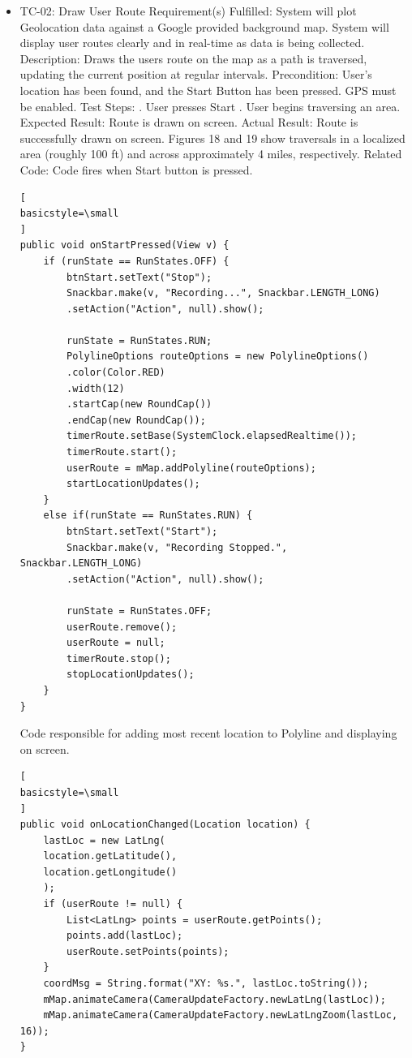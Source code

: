 \documentclass{article}
\begin{document}
\begin {itemize}
\item TC-02: Draw User Route
\subitem Requirement(s) Fulfilled:
\subsubitem System will plot Geolocation data against a Google provided background map.
\subsubitem System will display user routes clearly and in real-time as data is being collected.
\subitem Description: Draws the users route on the map as a path is traversed, updating the current position at regular intervals.
\subitem Precondition: User's location has been found, and the Start Button has been pressed. GPS must be enabled.
\subitem Test Steps:
. User presses Start
. User begins traversing an area.
\subitem Expected Result: Route is drawn on screen.
\subitem Actual Result: Route is successfully drawn on screen. Figures 18 and 19 show traversals in a localized area (roughly 100 ft) and across approximately 4 miles, respectively.
\subitem Related Code:
Code fires when Start button is pressed.
\begin{lstlisting}[
basicstyle=\small
]
public void onStartPressed(View v) {
    if (runState == RunStates.OFF) {
        btnStart.setText("Stop");
        Snackbar.make(v, "Recording...", Snackbar.LENGTH_LONG)
        .setAction("Action", null).show();

        runState = RunStates.RUN;
        PolylineOptions routeOptions = new PolylineOptions()
        .color(Color.RED)
        .width(12)
        .startCap(new RoundCap())
        .endCap(new RoundCap());
        timerRoute.setBase(SystemClock.elapsedRealtime());
        timerRoute.start();
        userRoute = mMap.addPolyline(routeOptions);
        startLocationUpdates();
    }
    else if(runState == RunStates.RUN) {
        btnStart.setText("Start");
        Snackbar.make(v, "Recording Stopped.", Snackbar.LENGTH_LONG)
        .setAction("Action", null).show();

        runState = RunStates.OFF;
        userRoute.remove();
        userRoute = null;
        timerRoute.stop();
        stopLocationUpdates();
    }
}
\end{lstlisting}
Code responsible for adding most recent location to Polyline and displaying on screen.
\begin{lstlisting}[
basicstyle=\small
]
public void onLocationChanged(Location location) {
    lastLoc = new LatLng(
    location.getLatitude(),
    location.getLongitude()
    );
    if (userRoute != null) {
        List<LatLng> points = userRoute.getPoints();
        points.add(lastLoc);
        userRoute.setPoints(points);
    }
    coordMsg = String.format("XY: %s.", lastLoc.toString());
    mMap.animateCamera(CameraUpdateFactory.newLatLng(lastLoc));
    mMap.animateCamera(CameraUpdateFactory.newLatLngZoom(lastLoc, 16));
}
\end{lstlisting}


\end{itemize}
\end{document}
